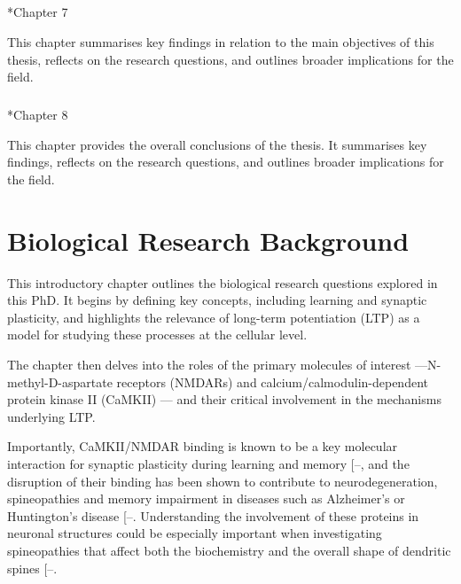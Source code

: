 \documentclass[
  11pt,
  letterpaper,
]{scrreprt}
\makeatletter
\let\oldparagraph\paragraph
\renewcommand{\paragraph}{
    \@ifstar
      \xxxParagraphStar
      \xxxParagraphNoStar
  }
\newcommand{\xxxParagraphStar}[1]{\oldparagraph*{#1}\mbox{}}
\newcommand{\xxxParagraphNoStar}[1]{\oldparagraph{#1}\mbox{}}
\makeatother
\begin{document}
\paragraph*{Chapter 7}\label{chapter-7}

This chapter summarises key findings in relation to the main objectives
of this thesis, reflects on the research questions, and outlines broader
implications for the field.

\paragraph*{Chapter 8}\label{chapter-8}

This chapter provides the overall conclusions of the thesis. It
summarises key findings, reflects on the research questions, and
outlines broader implications for the field.


\chapter{Biological Research Background}\label{sec-biology-chapter}

This introductory chapter outlines the biological research questions
explored in this PhD. It begins by defining key concepts, including
learning and synaptic plasticity, and highlights the relevance of
long-term potentiation (LTP) as a model for studying these processes at
the cellular level.

The chapter then delves into the roles of the primary molecules of
interest ---N-methyl-D-aspartate receptors (NMDARs) and
calcium/calmodulin-dependent protein kinase II (CaMKII) --- and their
critical involvement in the mechanisms underlying LTP.

Importantly, CaMKII/NMDAR binding is known to be a key molecular
interaction for synaptic plasticity during learning and memory
{[}--\citeproc{ref-bayer2024Revised}{11}{]},
and the disruption of their binding has been shown to contribute to
neurodegeneration, spineopathies and memory impairment in diseases such
as Alzheimer's or Huntington's disease
{[}--\citeproc{ref-yang2023NMDA}{8}{]}.
Understanding the involvement of these proteins in neuronal structures
could be especially important when investigating spineopathies that
affect both the biochemistry and the overall shape of dendritic spines
{[}--\citeproc{ref-yasuda2017Biophysics}{15}{]}.
\end{document}
